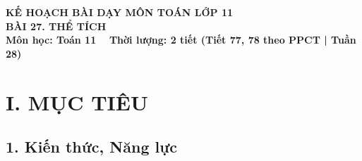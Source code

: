 \documentclass[12pt, a4paper]{article}
\begin{document}
\begin{center}
    {\fontsize{14pt}{17pt}\selectfont \textbf{KẾ HOẠCH BÀI DẠY MÔN TOÁN LỚP 11}}\\[6pt]
    {\fontsize{16pt}{19pt}\selectfont \textbf{BÀI 27. THỂ TÍCH}}\\[4pt]
    {\fontsize{12pt}{15pt}\selectfont \textbf{Môn học: Toán 11} \ \textbar \ \textbf{Thời lượng: 2 tiết (Tiết 77, 78 theo PPCT | Tuần 28)}}
\end{center}

\vspace{5pt}

\section*{I. MỤC TIÊU}

\subsection*{1. Kiến thức, Năng lực}
\end{document}
